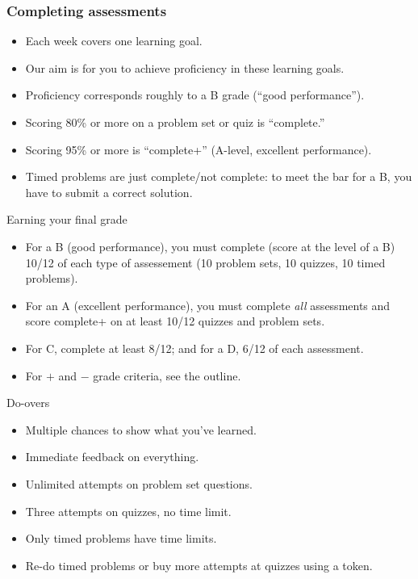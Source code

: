 \begin{frame}
  \frametitle{Completing assessments}

  \begin{itemize}[<+->]
    \item Each week covers one learning goal.
    \item Our aim is for you to achieve proficiency in these learning
    goals.
    \item Proficiency corresponds roughly to a B grade (``good performance'').
    \item Scoring 80\% or more on a
    problem set or quiz is ``complete.''
    \item Scoring 95\% or more is ``complete+'' (A-level,
    excellent performance).
    \item Timed problems are just complete/not complete: to meet
    the bar for a B, you have to submit a correct solution.
  \end{itemize}
\end{frame}

\begin{frame}{Earning your final grade}
  \begin{itemize}[<+->]
    \item For a B (good performance), you must complete (score at the level of a B) 10/12
    of each type of assessement (10 problem sets, 10 quizzes, 10
    timed problems).
    \item For an A (excellent performance), you must complete \emph{all} assessments and score complete+ on at least 10/12 quizzes and
    problem sets.
    \item For C, complete at least 8/12; and for a D, 6/12 of each assessment.
    \item For $+$ and $-$ grade criteria, see the outline.
  \end{itemize}
\end{frame}

\begin{frame}{Do-overs}
  \begin{itemize}[<+->]
    \item Multiple chances to show what you've learned.
    \item Immediate feedback on everything.
    \item Unlimited attempts on problem set questions.
    \item Three attempts on quizzes, no time limit.
    \item Only timed problems have time limits.
    \item Re-do timed problems or buy more attempts at quizzes using a token.
  \end{itemize}
\end{frame}


